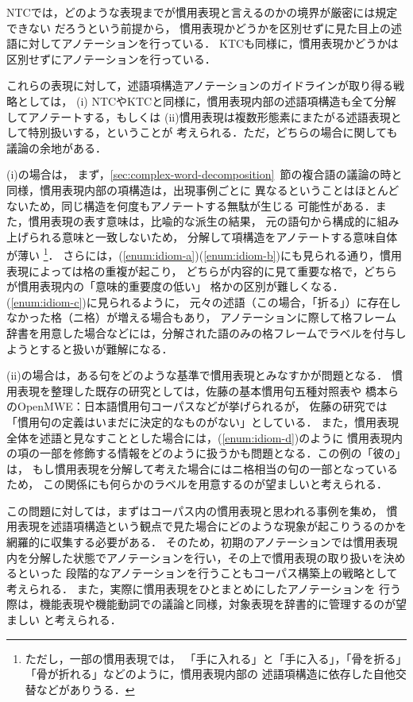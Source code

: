 \documentclass[japanese]{jnlp_1.4}
\begin{document}
NTCでは，どのような表現までが慣用表現と言えるのかの境界が厳密には規定できない
だろうという前提から，
慣用表現かどうかを区別せずに見た目上の述語に対してアノテーションを行っている．
KTCも同様に，慣用表現かどうかは区別せずにアノテーションを行っている．

これらの表現に対して，述語項構造アノテーションのガイドラインが取り得る戦略としては，
(i) NTCやKTCと同様に，慣用表現内部の述語項構造も全て分解してアノテートする，もしくは
(ii)慣用表現は複数形態素にまたがる述語表現として特別扱いする，ということが
考えられる．ただ，どちらの場合に関しても議論の余地がある．

(i)の場合は，
まず，\ref{sec:complex-word-decomposition}~節の複合語の議論の時と同様，慣用表現内部の項構造は，出現事例ごとに
異なるということはほとんどないため，同じ構造を何度もアノテートする無駄が生じる
可能性がある．また，慣用表現の表す意味は，比喩的な派生の結果，
元の語句から構成的に組み上げられる意味と一致しないため，
分解して項構造をアノテートする意味自体が薄い
\footnote{ただし，一部の慣用表現では，
「手に入れる」と「手に入る」，「骨を折る」「骨が折れる」などのように，慣用表現内部の
述語項構造に依存した自他交替などがありうる．}．
さらには，(\ref{enum:idiom-a})(\ref{enum:idiom-b})にも見られる通り，慣用表現によっては格の重複が起こり，
どちらが内容的に見て重要な格で，どちらが慣用表現内の「意味的重要度の低い」
格かの区別が難しくなる．(\ref{enum:idiom-c})に見られるように，
元々の述語（この場合，「折る」）に存在しなかった格（ニ格）が増える場合もあり，
アノテーションに際して格フレーム辞書を用意した場合などには，分解された語のみの格フレームでラベルを付与しようとすると扱いが難解になる．

(ii)の場合は，ある句をどのような基準で慣用表現とみなすかが問題となる．
慣用表現を整理した既存の研究としては，佐藤の基本慣用句五種対照表\cite{佐藤理史:2007-03-28}や
橋本らのOpenMWE：日本語慣用句コーパス\cite{hashimoto2008construction}などが挙げられるが，
佐藤の研究では「慣用句の定義はいまだに決定的なものがない」としている．
また，慣用表現全体を述語と見なすこととした場合には，(\ref{enum:idiom-d})のように
慣用表現内の項の一部を修飾する情報をどのように扱うかも問題となる．この例の「彼の」は，
もし慣用表現を分解して考えた場合にはニ格相当の句の一部となっているため，
この関係にも何らかのラベルを用意するのが望ましいと考えられる．

この問題に対しては，まずはコーパス内の慣用表現と思われる事例を集め，
慣用表現を述語項構造という観点で見た場合にどのような現象が起こりうるのかを網羅的に収集する必要がある．
そのため，初期のアノテーションでは慣用表現内を分解した状態でアノテーションを行い，その上で慣用表現の取り扱いを決めるといった
段階的なアノテーションを行うこともコーパス構築上の戦略として考えられる．
また，実際に慣用表現をひとまとめにしたアノテーションを
行う際は，機能表現や機能動詞での議論と同様，対象表現を辞書的に管理するのが望ましい
と考えられる．
\end{document}

